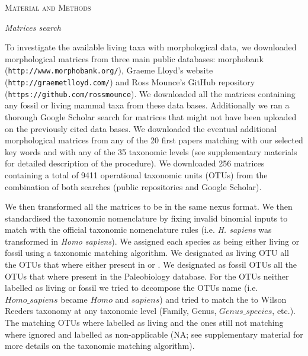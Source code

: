 \documentclass[12pt,letterpaper]{article}
\renewcommand{\section}[1]{%
\bigskip
\begin{center}
\begin{Large}
\normalfont\scshape #1
\medskip
\end{Large}
\end{center}}
\renewcommand{\subsection}[1]{%
\bigskip
\begin{center}
\begin{large}
\normalfont\itshape #1
\end{large}
\end{center}}
\begin{document}

%
%
 
\newpage

\section{Material and Methods}
\subsection{Matrices search}
To investigate the available living taxa with morphological data, we downloaded morphological matrices from three main public databases: morphobank (\texttt{http://www.morphobank.org/}), Graeme Lloyd's website (\texttt{http://graemetlloyd.com/}) and Ross Mounce's GitHub repository (\texttt{https://github.com/rossmounce}). We downloaded all the matrices containing any fossil or living mammal taxa from these data bases. Additionally we ran a thorough Google Scholar search for matrices that might not have been uploaded on the previously cited data bases. We downloaded the eventual additional morphological matrices from any of the 20 first papers matching with our selected key words and with any of the 35 taxonomic levels (see supplementary materials for detailed description of the procedure). We downloaded 256 %
matrices containing a total of 9411 %
operational taxonomic units (OTUs) from the combination of both searches (public repositories and Google Scholar).

We then transformed all the matrices to be in the same nexus format. We then standardised the taxonomic nomenclature by fixing invalid binomial inputs to match with the official taxonomic nomenclature rules (i.e. \textit{H. sapiens} was transformed in \textit{Homo sapiens}). We assigned each species as being either living or fossil using a taxonomic matching algorithm. We designated as living OTU all the OTUs that where either present in \cite{FritzTree} or \cite{wilson2005mammal}. We designated as fossil OTUs all the OTUs that where present in the Paleobiology database. For the OTUs neither labelled as living or fossil we tried to decompose the OTUs name (i.e. $Homo\_sapiens$ became $Homo$ and $sapiens$) and tried to match the to Wilson Reeders taxonomy at any taxonomic level (Family, Genus, $Genus\_species$, etc.). The matching OTUs where labelled as living and the ones still not matching where ignored and labelled as non-applicable (NA; see supplementary material for more details on the taxonomic matching algorithm).
\end{document}
